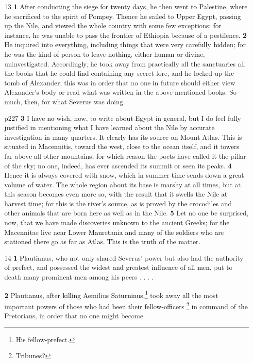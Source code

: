 13
\textbf{1} After conducting the siege for twenty days, he then went to Palestine, where he sacrificed to the spirit of Pompey. Thence he sailed to Upper Egypt, passing up the Nile, and viewed the whole country with some few exceptions; for instance, he was unable to pass the frontier of Ethiopia because of a pestilence. \textbf{2} He inquired into everything, including things that were very carefully hidden; for he was the kind of person to leave nothing, either human or divine, uninvestigated. Accordingly, he took away from practically all the sanctuaries all the books that he could find containing any secret lore, and he locked up the tomb of Alexander; this was in order that no one in future should either view Alexander's body or read what was written in the above-mentioned books. So much, then, for what Severus was doing.

p227
\textbf{3} I have no wish, now, to write about Egypt in general, but I do feel fully justified in mentioning what I have learned about the Nile by accurate investigation in many quarters. It clearly has its source on Mount Atlas. This is situated in Macennitis, toward the west, close to the ocean itself, and it towers far above all other mountains, for which reason the poets have called it the pillar of the sky; no one, indeed, has ever ascended its summit or seen its peaks. \textbf{4} Hence it is always covered with snow, which in summer time sends down a great volume of water. The whole region about its base is marshy at all times, but at this season becomes even more so, with the result that it swells the Nile at harvest time; for this is the river's source, as is proved by the crocodiles and other animals that are born here as well as in the Nile. \textbf{5} Let no one be surprised, now, that we have made discoveries unknown to the ancient Greeks; for the Macennitae live near Lower Mauretania and many of the soldiers who are stationed there go as far as Atlas. This is the truth of the matter.

14
\textbf{1} Plautianus, who not only shared Severus' power but also had the authority of prefect, and possessed the widest and greatest influence of all men, put to death many prominent men among his peers . . . .

\textbf{2} Plautianus, after killing Aemilius Saturninus,\texthebrew{⁠}\footnote{His fellow-prefect.

} took away all the most important powers of those who had been their fellow-officers \texthebrew{⁠}\footnote{Tribunes?

} in command of the Pretorians, in order that no one might become

